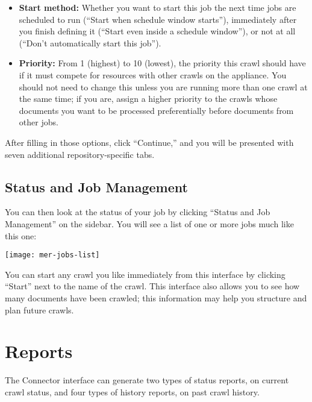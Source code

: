 \begin{changemargin}{1.5in}{0in}
\begin{itemize}
\item \textbf{Start method:} Whether you want to start this job the next
time jobs are scheduled to run (``Start when schedule window starts''),
immediately after you finish defining it (``Start even inside a schedule
window''), or not at all (``Don't automatically start this job'').

\item \textbf{Priority:} From 1 (highest) to 10 (lowest), the priority
this crawl should have if it must compete for resources with other
crawls on the appliance. You should not need to change this unless you
are running more than one crawl at the same time; if you are, assign a
higher priority to the crawls whose documents you want to be processed
preferentially before documents from other jobs.

\end{itemize}

After filling in those options, click ``Continue,'' and you will be
presented with seven additional repository-specific tabs. 



\subsection{\label{ManageJobs}Status and Job Management}

You can then look at the status of your job by clicking ``Status and 
Job Management'' on the sidebar. You will see a list of one or more jobs
much like this one:

\texttt{[image: mer-jobs-list]}

You can start any crawl you like immediately from this interface by
clicking ``Start'' next to the name of the crawl. This interface also
allows you to see how many documents have been crawled; this information
may help you structure and plan future crawls.


\section{Reports}

The Connector interface can generate two types of status reports, on
current crawl status, and four types of history reports, on past crawl
history.


\end{changemargin}
